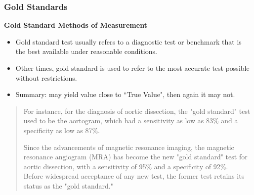 \documentclass[compress]{beamer}        %
\begin{document}
\begin{frame}
	\frametitle{Gold Standards}
	\large
	\vspace{-1.3cm}
	\textbf{Gold Standard Methods of Measurement}
	\begin{itemize}
		\item	Gold standard test usually refers to a diagnostic test or benchmark that is the best available under reasonable conditions.
		
		
		\item	Other times, gold standard is used to refer to the most accurate test possible without restrictions.
		\item Summary: may yield value close to ``True Value", then again it may not.
	\end{itemize}
\end{frame}

\begin{frame}
	\large
	\begin{framed}
		\begin{quote}
			For instance, for the diagnosis of aortic dissection, the "gold standard" test used to be the aortogram, which had a sensitivity as low as 83\% and a specificity as low as 87\%. \\ \smallskip
			
			Since the advancements of magnetic resonance imaging, the magnetic resonance angiogram (MRA) has become the new "gold standard" test for aortic dissection, with a sensitivity of 95\% and a specificity of 92\%. 
			\\ \smallskip
			Before widespread acceptance of any new test, the former test retains its status as the "gold standard."
		\end{quote}
	\end{framed}
	
\end{frame}
\end{document}

